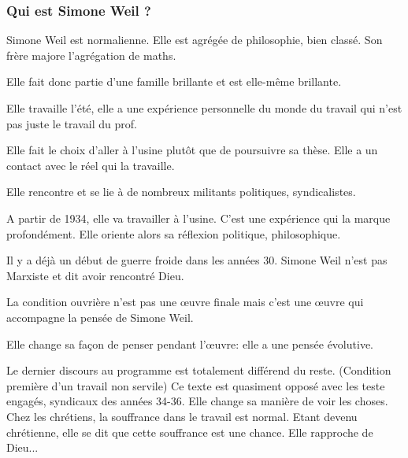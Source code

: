 \documentclass[a4paper, 11pt, hidelinks]{article}
\begin{document}
\subsubsection{Qui est Simone Weil ?}


Simone Weil est normalienne. Elle est agrégée de philosophie, bien classé. Son frère majore l'agrégation de maths.


Elle fait donc partie d'une famille brillante et est elle-même brillante.


Elle travaille l'été, elle a une expérience personnelle du monde du travail qui n'est pas juste le travail du prof.


Elle fait le choix d'aller à l'usine plutôt que de poursuivre sa thèse. Elle a un contact avec le réel qui la travaille.


Elle rencontre et se lie à de nombreux militants politiques, syndicalistes.


A partir de 1934, elle va travailler à l'usine. C'est une expérience qui la marque profondément. Elle oriente alors sa réflexion politique,
philosophique.


Il y a déjà un début de guerre froide dans les années 30. Simone Weil n'est pas Marxiste et dit avoir rencontré Dieu.


La condition ouvrière n'est pas une \oe uvre finale mais c'est une \oe uvre qui accompagne la pensée de Simone Weil.


Elle change sa façon de penser pendant l'\oe uvre: elle a une pensée évolutive.


Le dernier discours au programme est totalement différend du reste. (Condition première d'un travail non servile) 
Ce texte est quasiment opposé avec les teste engagés, syndicaux des années 34-36. Elle change sa manière de voir les choses.
Chez les chrétiens, la souffrance dans le travail est normal. Etant devenu chrétienne, elle se dit que cette souffrance est une chance.
Elle rapproche de Dieu...
\end{document}
